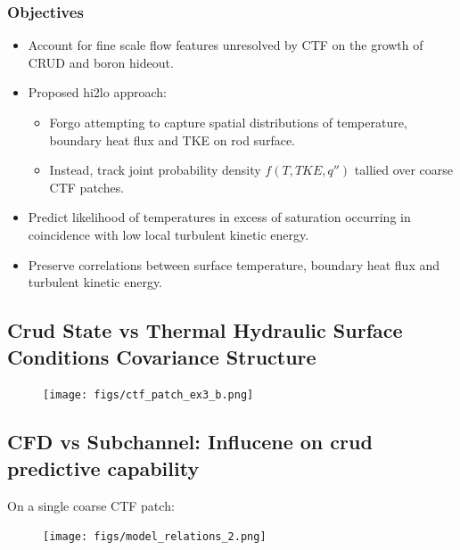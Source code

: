 \documentclass[t, pdftex]{beamer}
\begin{document}
\begin{frame}\frametitle{Objectives}
\begin{itemize}
\item Account for fine scale flow features unresolved by CTF on the growth of CRUD and boron hideout.
\item Proposed hi2lo approach:
\begin{itemize}
	\item Forgo attempting to capture spatial distributions of temperature, boundary heat flux and TKE on rod surface. 
	\item Instead, track joint probability density $f(T, TKE, q'')$ tallied over coarse CTF patches.
\end{itemize}
	\item Predict likelihood of temperatures in excess of saturation occurring in coincidence with low local turbulent kinetic energy.
	\item Preserve correlations between surface temperature, boundary heat flux and turbulent kinetic energy.
\end{itemize}
\end{frame}


\subsection*{Crud State vs Thermal Hydraulic Surface Conditions Covariance Structure}
\begin{frame}
\begin{figure}[]
\vspace{-16.5pt}
\centering
\texttt{[image: figs/ctf\_patch\_ex3\_b.png]}
\label{model_overview}
\end{figure}
\end{frame}

\subsection*{CFD vs Subchannel:  Influcene on crud predictive capability}
\begin{frame}
On a single coarse CTF patch:
\vspace{-6.5pt}
\begin{figure}[!htbp]
\centering
\texttt{[image: figs/model\_relations\_2.png]}
\label{model_overview}
\end{figure}
\end{frame}
\end{document}
